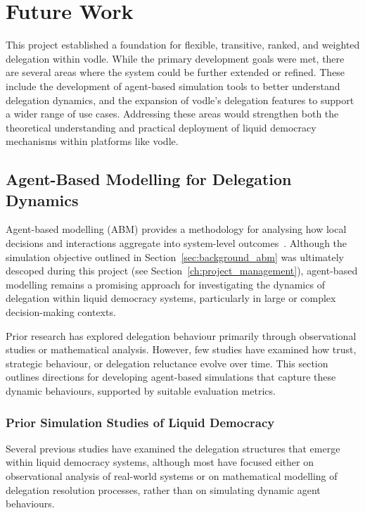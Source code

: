 \chapter{Future Work}
This project established a foundation for flexible, transitive, ranked, and weighted delegation within vodle. While the primary development goals were met, there are several areas where the system could be further extended or refined. These include the development of agent-based simulation tools to better understand delegation dynamics, and the expansion of vodle's delegation features to support a wider range of use cases. Addressing these areas would strengthen both the theoretical understanding and practical deployment of liquid democracy mechanisms within platforms like vodle.

\section{Agent-Based Modelling for Delegation Dynamics}

Agent-based modelling (ABM) provides a methodology for analysing how local decisions and interactions aggregate into system-level outcomes~\citep{bonabeau2002agent}. Although the simulation objective outlined in Section~\ref{sec:background_abm} was ultimately descoped during this project (see Section~\ref{ch:project_management}), agent-based modelling remains a promising approach for investigating the dynamics of delegation within liquid democracy systems, particularly in large or complex decision-making contexts.

Prior research has explored delegation behaviour primarily through observational studies or mathematical analysis. However, few studies have examined how trust, strategic behaviour, or delegation reluctance evolve over time. This section outlines directions for developing agent-based simulations that capture these dynamic behaviours, supported by suitable evaluation metrics.

\subsection{Prior Simulation Studies of Liquid Democracy}

Several previous studies have examined the delegation structures that emerge within liquid democracy systems, although most have focused either on observational analysis of real-world systems or on mathematical modelling of delegation resolution processes, rather than on simulating dynamic agent behaviours.

